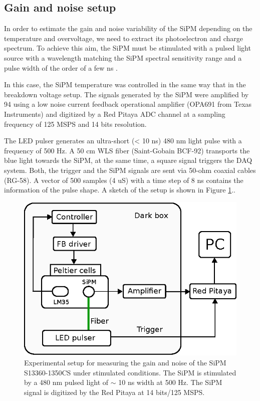 \documentclass[a4paper,11pt]{article}
\begin{document}
\subsection{Gain and noise setup}

In order to estimate the gain and noise variability of the SiPM depending on the temperature and overvoltage, we need to extract its photoelectron and charge spectrum. To achieve this aim, the SiPM must be stimulated with a pulsed light source with a wavelength matching the SiPM spectral sensitivity range and a pulse width of the order of a few ns \cite{Georgiev2016, Eigen2019}.

In this case, the SiPM temperature was controlled in the same way that in the breakdown voltage setup. The signals generated by the SiPM were amplified by 94 using a low noise current feedback operational amplifier (OPA691 from Texas Instruments) and digitized by a Red Pitaya ADC channel at a sampling frequency of 125 MSPS and 14 bits resolution.

The LED pulser generates an ultra-short (< 10 ns) 480 nm light pulse with a frequency of 500 Hz. A 50 cm WLS fiber (Saint-Gobain BCF-92) transports the blue light towards the SiPM, at the same time, a square signal triggers the DAQ system. Both, the trigger and the SiPM signals are sent via 50-ohm coaxial cables (RG-58). A vector of 500 samples (4 uS) with a time step of 8 ns contains the information of the pulse shape. A sketch of the setup is shown in Figure \ref{fig:set2}..


\begin{figure}[htbp]
\centering %
\includegraphics[width=.6\textwidth]{Figures/ExpSet2.eps}
\caption{\label{fig:set2} Experimental setup for measuring the gain and noise of the SiPM S13360-1350CS under stimulated conditions. The SiPM is stimulated by a 480 nm pulsed light of $\sim$ 10 ns width at 500 Hz. The SiPM signal is digitized by the Red Pitaya at 14 bits/125 MSPS.}
\end{figure}
\end{document}
